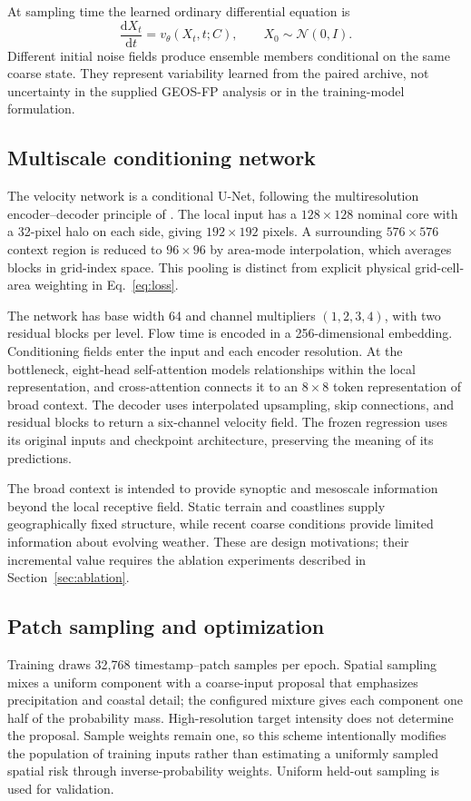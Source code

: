 \documentclass[10pt]{article}
\begin{document}
At sampling time the learned ordinary differential equation is
\begin{equation}
\frac{\mathrm d X_t}{\mathrm dt}=v_\theta(X_t,t;C),
\qquad X_0\sim\mathcal N(0,I).
\label{eq:ode}
\end{equation}
Different initial noise fields produce ensemble members conditional on the same coarse state. They represent variability learned from the paired archive, not uncertainty in the supplied GEOS-FP analysis or in the training-model formulation.

\subsection{Multiscale conditioning network}
The velocity network is a conditional U-Net, following the multiresolution encoder--decoder principle of \citet{ronneberger2015}. The local input has a $128\times128$ nominal core with a 32-pixel halo on each side, giving $192\times192$ pixels. A surrounding $576\times576$ context region is reduced to $96\times96$ by area-mode interpolation, which averages blocks in grid-index space. This pooling is distinct from explicit physical grid-cell-area weighting in Eq.~\eqref{eq:loss}.

The network has base width 64 and channel multipliers $(1,2,3,4)$, with two residual blocks per level. Flow time is encoded in a 256-dimensional embedding. Conditioning fields enter the input and each encoder resolution. At the bottleneck, eight-head self-attention models relationships within the local representation, and cross-attention connects it to an $8\times8$ token representation of broad context. The decoder uses interpolated upsampling, skip connections, and residual blocks to return a six-channel velocity field. The frozen regression uses its original inputs and checkpoint architecture, preserving the meaning of its predictions.

The broad context is intended to provide synoptic and mesoscale information beyond the local receptive field. Static terrain and coastlines supply geographically fixed structure, while recent coarse conditions provide limited information about evolving weather. These are design motivations; their incremental value requires the ablation experiments described in Section~\ref{sec:ablation}.

\subsection{Patch sampling and optimization}
Training draws 32,768 timestamp--patch samples per epoch. Spatial sampling mixes a uniform component with a coarse-input proposal that emphasizes precipitation and coastal detail; the configured mixture gives each component one half of the probability mass. High-resolution target intensity does not determine the proposal. Sample weights remain one, so this scheme intentionally modifies the population of training inputs rather than estimating a uniformly sampled spatial risk through inverse-probability weights. Uniform held-out sampling is used for validation.
\end{document}
